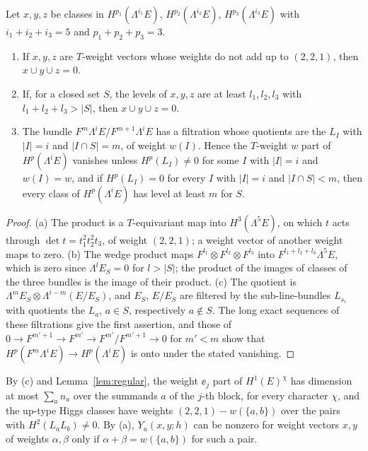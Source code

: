 \begin{lemma}\label{lem:selection}
Let $x,y,z$ be classes in $H^{p_1}(\Lambda^{i_1}E)$, $H^{p_2}(\Lambda^{i_2}E)$,
$H^{p_3}(\Lambda^{i_3}E)$ with $i_1+i_2+i_3=5$ and $p_1+p_2+p_3=3$.
\begin{enumerate}[label=\textup{(\alph*)},leftmargin=*,itemsep=1pt]
\item If $x,y,z$ are $T$-weight vectors whose weights do not add up to
$(2,2,1)$, then $x\cup y\cup z=0$.
\item If, for a closed set $S$, the levels of $x,y,z$ are at least
$l_1,l_2,l_3$ with $l_1+l_2+l_3>|S|$, then $x\cup y\cup z=0$.
\item The bundle $F^m\Lambda^iE/F^{m+1}\Lambda^iE$ has a filtration whose
quotients are the $L_I$ with $|I|=i$ and $|I\cap S|=m$, of weight $w(I)$.
Hence the $T$-weight $w$ part of $H^p(\Lambda^iE)$ vanishes unless
$H^p(L_I)\ne0$ for some $I$ with $|I|=i$ and $w(I)=w$, and if
$H^p(L_I)=0$ for every $I$ with $|I|=i$ and $|I\cap S|<m$, then every class
of $H^p(\Lambda^iE)$ has level at least $m$ for $S$.
\end{enumerate}
\end{lemma}
\begin{proof}
(a) The product is a $T$-equivariant map into $H^3(\Lambda^5E)$, on which
$t$ acts through $\det t=t_1^2t_2^2t_3$, of weight $(2,2,1)$; a weight
vector of another weight maps to zero. (b) The wedge product maps
$F^{l_1}\otimes F^{l_2}\otimes F^{l_3}$ into $F^{l_1+l_2+l_3}\Lambda^5E$,
which is zero since $\Lambda^lE_S=0$ for $l>|S|$; the product of the images
of classes of the three bundles is the image of their product. (c) The
quotient is $\Lambda^mE_S\otimes\Lambda^{i-m}(E/E_S)$, and $E_S$, $E/E_S$
are filtered by the sub-line-bundles $L_{s_i}$ with quotients the
$L_a$, $a\in S$, respectively $a\notin S$. The long exact sequences of
these filtrations give the first assertion, and those of
$0\to F^{m'+1}\to F^{m'}\to F^{m'}/F^{m'+1}\to0$ for $m'<m$ show that
$H^p(F^m\Lambda^iE)\to H^p(\Lambda^iE)$ is onto under the stated vanishing.
\end{proof}

By (c) and Lemma~\ref{lem:regular}, the weight $\ee_j$ part of
$H^1(E)^\chi$ has dimension at most $\sum_{a}n_a$ over the summands $a$ of
the $j$-th block, for every character $\chi$, and the up-type Higgs
classes have weights $(2,2,1)-w(\{a,b\})$ over the pairs with
$H^2(L_aL_b)\ne0$. By (a), $Y_u(x,y;h)$ can be nonzero for weight vectors
$x,y$ of weights $\alpha,\beta$ only if $\alpha+\beta=w(\{a,b\})$ for such
a pair.

